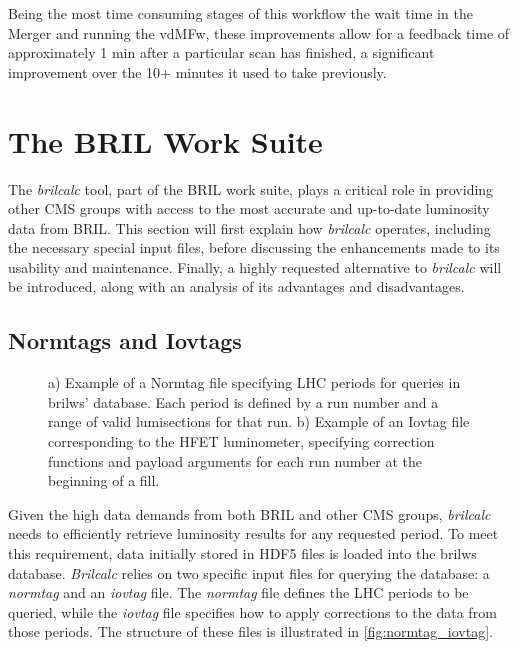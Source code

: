 Being the most time consuming stages of this workflow the wait time in the Merger and running the vdMFw, these improvements allow for a feedback time of approximately 1 min after a particular scan has finished, a significant improvement over the 10+ minutes it used to take previously.
 

\section{The BRIL Work Suite}
\label{sec:the_bril_work_suite}

The \textit{brilcalc} tool, part of the BRIL work suite, plays a critical role in providing other CMS groups with access to the most accurate and up-to-date luminosity data from BRIL. This section will first explain how \textit{brilcalc} operates, including the necessary special input files, before discussing the enhancements made to its usability and maintenance. Finally, a highly requested alternative to \textit{brilcalc} will be introduced, along with an analysis of its advantages and disadvantages.

\subsection{Normtags and Iovtags}

\begin{figure}[!htb]
	\centering
	\caption{a) Example of a Normtag file specifying LHC periods for queries in brilws' database. Each period is defined by a run number and a range of valid lumisections for that run. b) Example of an Iovtag file corresponding to the HFET luminometer, specifying correction functions and payload arguments for each run number at the beginning of a fill.}
	\label{fig:normtag_iovtag}
\end{figure}

Given the high data demands from both BRIL and other CMS groups, \textit{brilcalc} needs to efficiently retrieve luminosity results for any requested period. To meet this requirement, data initially stored in HDF5 files is loaded into the brilws database. \textit{Brilcalc} relies on two specific input files for querying the database: a \textit{normtag} and an \textit{iovtag} file. The \textit{normtag} file defines the LHC periods to be queried, while the \textit{iovtag} file specifies how to apply corrections to the data from those periods. The structure of these files is illustrated in \autoref{fig:normtag_iovtag}.

